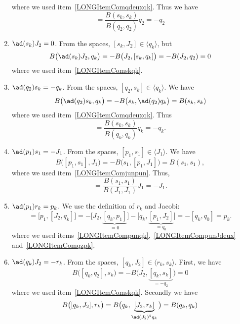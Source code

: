 \begin{enumerate}
	where we used item~\ref{LONGItemComqdeuxqk}. Thus we have
	\begin{equation}
		[s_k,q_k]=\frac{ B(s_k,s_k) }{ B(q_2,q_2) }q_2=-q_2
	\end{equation}
	\item$\ad(s_k)J_2=0$. From the spaces, $[s_k,J_2]\in\langle q_k\rangle$, but
	\begin{equation}
		B\big( \ad(s_k)J_2,q_k \big)=-B\big( J_2,[s_k,q_k] \big)=-B(J_2,q_2)=0
	\end{equation}
	where we used item~\ref{LONGItemComskqk}.
	\item$\ad(q_2)s_k=-q_k$. From the spaces, $[q_2,s_k]\in\langle q_k\rangle$. We have
	\begin{equation}
		B\big( \ad(q_2)s_k,q_k \big)=-B\big( s_k,\ad(q_2)q_k \big)=B(s_k,s_k)
	\end{equation}
	where we used item~\ref{LONGItemComqdeuxqk}. Thus
	\begin{equation}
		[q_2,s_k]=\frac{ B(s_k,s_k) }{ B(q_k,q_k) }q_k=-q_k.
	\end{equation}
	\item$\ad(p_1)s_1=-J_1$. From the spaces, $[p_1,s_1]\in\langle J_1\rangle$. We have
	\begin{equation}
		B\big( [p_1,s_1],J_1 \big)=-B\big( s_1,[p_1,J_1] \big)=B(s_1,s_1),
	\end{equation}
	where we used item~\ref{LONGItemComjunpun}. Thus,
	\begin{equation}
		[p_1,s_1]=\frac{ B(s_1,s_1) }{ B(J_1,J_1) }J_1=-J_1.
	\end{equation}
	\item$\ad(p_1)r_k=p_k$\label{LONGItemCompunrk}. We use the definition of $r_k$ and Jacobi:
	\begin{equation}
		[p_1,r_k]=\big[ p_1,[J_2,q_k] \big]=-\big[ J_2,\underbrace{[q_k,p_1]}_{=0} \big]-\big[ q_k,\underbrace{[p_1,J_2]}_{=q_0} \big]=-[q_k,q_0]=p_k.
	\end{equation}
	where we used items~\ref{LONGItemCompunqk},~\ref{LONGItemCompunJdeux} and~\ref{LONGItemComqzpk}.
	\item$\ad(q_k)J_2=-r_k$\label{LONGItemComkJdeux}. From the spaces, $[q_k,J_2]\in\langle r_k,s_k\rangle$. First, we have
	\begin{equation}
		B\big( [q_k,q_2],s_k \big)=-B\big( J_2,\underbrace{[q_k,s_k]}_{=-q_2} \big)=0
	\end{equation}
	where we used item~\ref{LONGItemComskqk}. Secondly we have
	\begin{equation}
		B\big( [q_k,J_2],r_k \big)=B\big( q_k,\underbrace{[J_2,r_k]}_{\ad(J_2)^2q_k} \big)=B(q_k,q_k)

\end{equation}
\end{enumerate}
